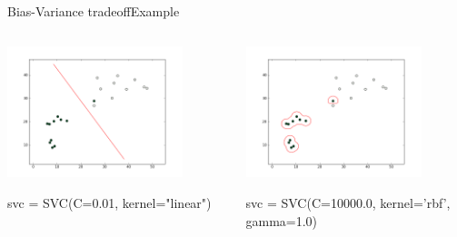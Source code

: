 \documentclass[xcolor=dvipsnames]{beamer}
\begin{document}
\begin{frame}{Bias-Variance tradeoff}{Example}
    \begin{columns}
        \begin{column}{0.5\textwidth}
            \begin{center}
                \includegraphics[width=0.8\textwidth]{figs/basic_linear.png}
            \end{center}
            svc = SVC(C=0.01, kernel="linear")
        \end{column}
        \begin{column}{0.5\textwidth}
            \begin{center}
                \includegraphics[width=0.8\textwidth]{figs/gamma_1.png}
            \end{center}
            svc = SVC(C=10000.0, kernel='rbf', gamma=1.0)
        \end{column}
    \end{columns}
    \vspace{1em}
\end{frame}
\end{document}
